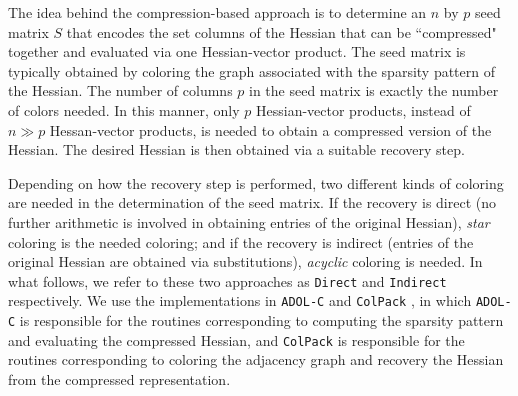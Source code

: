 \documentclass[11pt, a4paper, english]{article}
\begin{document}
The idea behind the compression-based approach is to determine an $n$ by $p$ seed matrix $S$
that encodes the set columns of the Hessian that can be ``compressed" together and evaluated via one Hessian-vector product. The seed matrix is typically obtained by
coloring the graph associated with the sparsity pattern of the Hessian. 
The number of columns $p$ in the seed matrix is exactly the number of colors needed. 
In this manner, only $p$ Hessian-vector products, instead of $n \gg p$ Hessan-vector products, is needed to obtain a compressed version of the Hessian. The desired Hessian is then obtained via a suitable recovery step.  

Depending on how the recovery step is performed, two different kinds of coloring are needed in the determination of the seed matrix. If the recovery is direct (no further arithmetic is involved in obtaining entries of the original Hessian),  {\em star} coloring is the needed coloring;
and if the recovery is indirect (entries of the original Hessian are obtained via substitutions), {\em acyclic} coloring is needed. In what follows, we refer to these two approaches  as {\tt Direct} and {\tt Indirect} respectively. We use the implementations in {\tt ADOL-C} \cite{walther2009getting} and {\tt ColPack} \cite{gebremedhin2013colpack}, in which {\tt ADOL-C} is responsible for the routines corresponding to computing the sparsity pattern and evaluating the compressed Hessian, and {\tt ColPack} is responsible for the routines  corresponding to coloring the adjacency graph and recovery the Hessian from the compressed representation.
\end{document}
